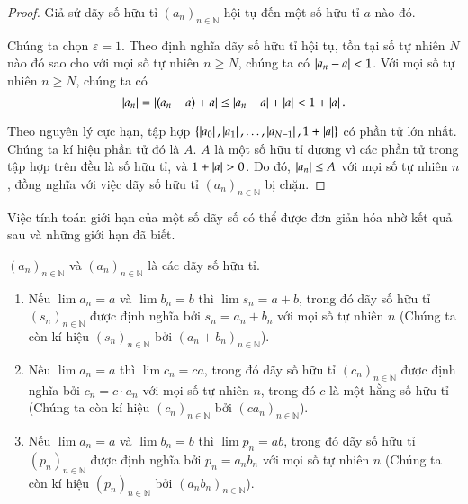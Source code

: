 \begin{proof}
    Giả sử dãy số hữu tỉ ${(a_{n})}_{n\in\mathbb{N}}$ hội tụ đến một số hữu tỉ $a$ nào đó.

    Chúng ta chọn $\varepsilon = 1$. Theo định nghĩa dãy số hữu tỉ hội tụ, tồn tại số tự nhiên $N$ nào đó sao cho với mọi số tự nhiên $n\geq N$, chúng ta có $\left\vert{a_{n} - a}\right\vert < 1$. Với mọi số tự nhiên $n\geq N$, chúng ta có
    \[
        \left\vert{a_{n}}\right\vert = \left\vert{(a_{n} - a) + a}\right\vert \leq \left\vert{a_{n} - a}\right\vert + \left\vert{a}\right\vert < 1 + \left\vert{a}\right\vert.
    \]

    Theo nguyên lý cực hạn, tập hợp $\{ \left\vert{a_{0}}\right\vert, \left\vert{a_{1}}\right\vert, \ldots, \left\vert{a_{N-1}}\right\vert, 1 + \left\vert{a}\right\vert \}$ có phần tử lớn nhất. Chúng ta kí hiệu phần tử đó là $A$. $A$ là một số hữu tỉ dương vì các phần tử trong tập hợp trên đều là số hữu tỉ, và $1 + \left\vert{a}\right\vert > 0$. Do đó, $\left\vert{a_{n}}\right\vert\leq A$ với mọi số tự nhiên $n$, đồng nghĩa với việc dãy số hữu tỉ ${(a_{n})}_{n\in\mathbb{N}}$ bị chặn.
\end{proof}

Việc tính toán giới hạn của một số dãy số có thể được đơn giản hóa nhờ kết quả sau và những giới hạn đã biết.
\begin{proposition}\label{proposition:limits-of-sum-and-product}
    ${(a_{n})}_{n\in\mathbb{N}}$ và ${(a_{n})}_{n\in\mathbb{N}}$ là các dãy số hữu tỉ.
    \begin{enumerate}[label={(\roman*)}]
        \item Nếu $\lim a_{n} = a$ và $\lim b_{n} = b$ thì $\lim s_{n} = a + b$, trong đó dãy số hữu tỉ ${(s_{n})}_{n\in\mathbb{N}}$ được định nghĩa bởi $s_{n} = a_{n} + b_{n}$ với mọi số tự nhiên $n$ (Chúng ta còn kí hiệu ${(s_{n})}_{n\in\mathbb{N}}$ bởi ${(a_{n} + b_{n})}_{n\in\mathbb{N}}$).
        \item Nếu $\lim a_{n} = a$ thì $\lim c_{n} = ca$, trong đó dãy số hữu tỉ ${(c_{n})}_{n\in\mathbb{N}}$ được định nghĩa bởi $c_{n} = c\cdot a_{n}$ với mọi số tự nhiên $n$, trong đó $c$ là một hằng số hữu tỉ (Chúng ta còn kí hiệu ${(c_{n})}_{n\in\mathbb{N}}$ bởi ${(ca_{n})}_{n\in\mathbb{N}}$).
        \item Nếu $\lim a_{n} = a$ và $\lim b_{n} = b$ thì $\lim p_{n} = ab$, trong đó dãy số hữu tỉ ${(p_{n})}_{n\in\mathbb{N}}$ được định nghĩa bởi $p_{n} = a_{n}b_{n}$ với mọi số tự nhiên $n$ (Chúng ta còn kí hiệu ${(p_{n})}_{n\in\mathbb{N}}$ bởi ${(a_{n}b_{n})}_{n\in\mathbb{N}}$).
    \end{enumerate}
\end{proposition}

